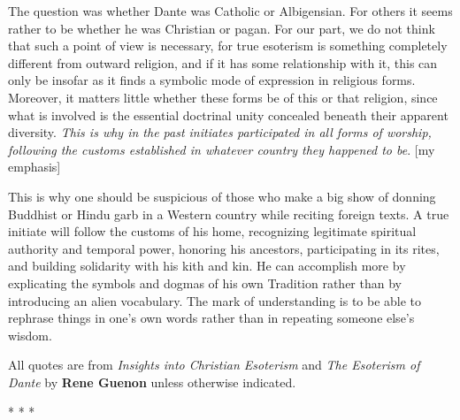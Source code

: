 \begin{quotex}
The question was whether Dante was Catholic or Albigensian. For others it seems rather to be whether he was Christian or pagan. For our part, we do not think that such a point of view is necessary, for true esoterism is something completely different from outward religion, and if it has some relationship with it, this can only be insofar as it finds a symbolic mode of expression in religious forms. Moreover, it matters little whether these forms be of this or that religion, since what is involved is the essential doctrinal unity concealed beneath their apparent diversity. \emph{This is why in the past initiates participated in all forms of worship, following the customs established in whatever country they happened to be}. [my emphasis] 

\end{quotex}
This is why one should be suspicious of those who make a big show of donning Buddhist or Hindu garb in a Western country while reciting foreign texts. A true initiate will follow the customs of his home, recognizing legitimate spiritual authority and temporal power, honoring his ancestors, participating in its rites, and building solidarity with his kith and kin. He can accomplish more by explicating the symbols and dogmas of his own Tradition rather than by introducing an alien vocabulary. The mark of understanding is to be able to rephrase things in one's own words rather than in repeating someone else's wisdom.

\hfill

All quotes are from \textit{Insights into Christian Esoterism} and \textit{The Esoterism of Dante} by \textbf{Rene Guenon} unless otherwise indicated.



\begin{center}* * *\end{center}

